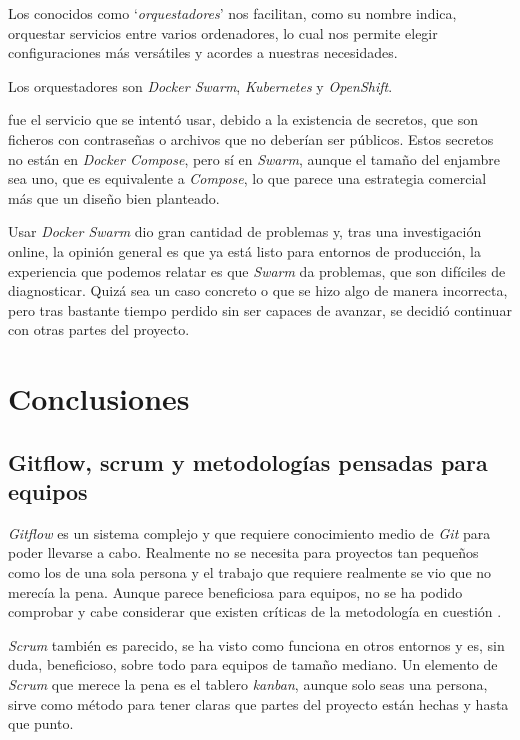 Los conocidos como `\emph{orquestadores}' nos facilitan, como su nombre indica, orquestar servicios entre varios ordenadores, lo cual nos permite elegir configuraciones más versátiles y acordes a nuestras necesidades. 

Los orquestadores son \emph{Docker Swarm}, \emph{Kubernetes} y \emph{OpenShift}.

 fue el servicio que se intentó usar, debido a la existencia de secretos, que son ficheros con contraseñas o archivos que no deberían ser públicos. Estos secretos no están en \emph{Docker Compose}, pero sí en \emph{Swarm}, aunque el tamaño del enjambre sea uno, que es equivalente a \emph{Compose}, lo que parece una estrategia comercial más que un diseño bien planteado.

Usar \emph{Docker Swarm} dio gran cantidad de problemas y, tras una investigación online, la opinión general es que ya está listo para entornos de producción, la experiencia que podemos relatar es que \emph{Swarm} da problemas, que son difíciles de diagnosticar. Quizá sea un caso concreto o que se hizo algo de manera incorrecta, pero tras bastante tiempo perdido sin ser capaces de avanzar, se decidió continuar con otras partes del proyecto.


\section{Conclusiones}

\subsection{Gitflow, scrum y metodologías pensadas para equipos}

\emph{Gitflow} es un sistema complejo y que requiere conocimiento medio de \emph{Git} para poder llevarse a cabo. Realmente no se necesita para proyectos tan pequeños como los de una sola persona y el trabajo que requiere realmente se vio que no merecía la pena. Aunque parece beneficiosa para equipos, no se ha podido comprobar y cabe considerar que existen críticas de la metodología en cuestión \cite{gfharm}.

\emph{Scrum} también es parecido, se ha visto como funciona en otros entornos y es, sin duda, beneficioso, sobre todo para equipos de tamaño mediano. Un elemento de \emph{Scrum} que merece la pena es el tablero \emph{kanban}, aunque solo seas una persona, sirve como método para tener claras que partes del proyecto están hechas y hasta que punto.

